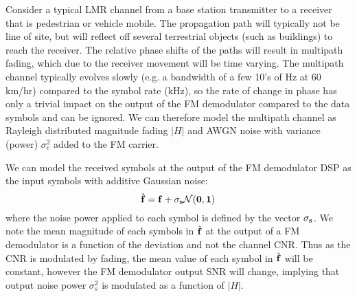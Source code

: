\documentclass{article}
\begin{document}
\begin{figure}[H]
\begin{center}
\end{center}
\end{figure}

Consider a typical LMR channel from a base station transmitter to a receiver that is pedestrian or vehicle mobile.  The propagation path will typically not be line of site, but will reflect off several terrestrial objects (such as buildings) to reach the receiver. The relative phase shifts of the paths will result in multipath fading, which due to the receiver movement will be time varying.  The multipath channel typically evolves slowly (e.g. a bandwidth of a few 10's of Hz at 60 km/hr) compared to the symbol rate (kHz), so the rate of change in phase has only a trivial impact on the output of the FM demodulator compared to the data symbols and can be ignored.  We can therefore model the multipath channel as Rayleigh distributed magnitude fading $|H|$ and AWGN noise with variance (power) $\sigma_c^2$ added to the FM carrier. 
 
We can model the received symbols at the output of the FM demodulator DSP as the input symbols with additive Gaussian noise:
\begin{equation}
\label{eq:fm_noise}
\hat{\bf{f}} = \bf{f} + \bf{\sigma_s}\mathcal{N}(0,1) 
\end{equation}
where the noise power applied to each symbol is defined by the vector $\bf{\sigma_s}$.  We note the mean magnitude of each symbols in $\hat{\bf{f}}$ at the output of a FM demodulator is a function of the deviation and not the channel CNR.  Thus as the CNR is modulated by fading, the mean value of each symbol in $\hat{\bf{f}}$ will be constant, however the FM demodulator output SNR will change, implying that output noise power $\sigma_s^2$ is modulated as a function of $|H|$.
\end{document}
